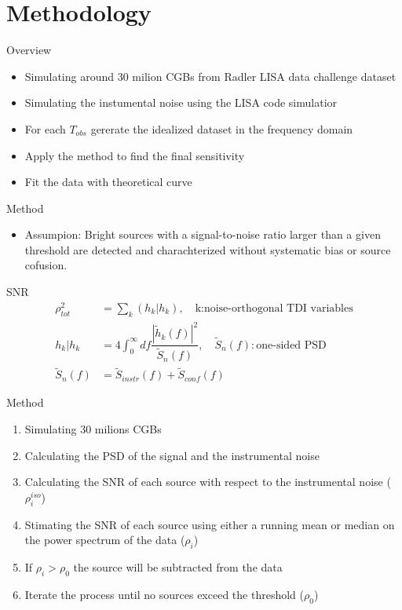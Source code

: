 \documentclass[pdf]{beamer}
\begin{document}
\section{Methodology}
\begin{frame}{Overview}
\begin{itemize}
\item Simulating around 30 milion CGBs from Radler LISA data challenge dataset
\item Simulating the instumental noise using the LISA code simulatior
\item For each $T_{obs}$ gererate the idealized dataset in the frequency domain
\item Apply the method to find the final sensitivity
\item Fit the data with theoretical curve
\end{itemize}
\end{frame}

\begin{frame}{Method}
\begin{itemize}
\item Assumpion: Bright sources with a signal-to-noise ratio larger than a given threshold are detected and charachterized without systematic bias or source cofusion.
\end{itemize}
\begin{block}{SNR}
\begin{align*}
\rho^2_{tot} &= \sum_k (h_k|h_k), \quad  \text{k:noise-orthogonal TDI variables} \\
h_k|h_k &= 4 \int_{0}^{\infty} df \dfrac{|\tilde{h}_k(f)|^2}{\tilde{S}_n(f)}, \quad \tilde{S}_n(f):\text{one-sided PSD} \\
\tilde{S}_n(f) &= \tilde{S}_{instr}(f) +\tilde{S}_{conf}(f)
\end{align*}
\end{block}
\end{frame}

\begin{frame}{Method}
\begin{enumerate}
\item Simulating 30 milions CGBs
\item Calculating the PSD of the signal and the instrumental noise
\item Calculating the SNR of each source with respect to the instrumental noise ($\rho_i^{iso}$)
\item Stimating the SNR of each source using either a running mean or median on the power spectrum of the data ($\rho_i$)
\item If $\rho_i > \rho_0$ the source will be subtracted from the data
\item Iterate the process until no sources exceed the threshold ($\rho_0$)
\end{enumerate}
\end{frame}
\end{document}
